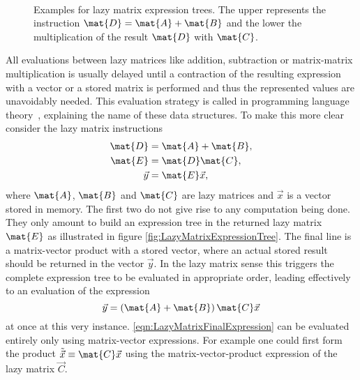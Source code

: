 \begin{figure}
	\centering
	 \\[0.8em]
	\caption[Examples for lazy matrix expression trees]
	{
		Examples for lazy matrix expression trees.
		The upper represents the instruction
		$\mat{D} = \mat{A} + \mat{B}$
		and the lower the multiplication of the result $\mat{D}$
		with $\mat{C}$.
	}
	\label{fig:LazyMatrixExpressionTree}
\end{figure}
All evaluations between lazy matrices
like addition, subtraction or matrix-matrix multiplication
is usually delayed until a contraction of the resulting
expression with a vector or a stored matrix is performed
and thus the represented values are unavoidably needed.
This evaluation strategy is called 
in programming language theory~\cite{Hudak1989},
explaining the name of these data structures.
To make this more clear consider the lazy matrix instructions
\begin{equation}
	\begin{aligned}
		\label{eqn:LazyMatrixInstructions}
		\mat{D} &= \mat{A} + \mat{B}, \\
		\mat{E} &= \mat{D} \mat{C}, \\
		\vec{y} &= \mat{E} \vec{x},
	\end{aligned}
\end{equation}
where $\mat{A}$, $\mat{B}$ and $\mat{C}$ are lazy matrices
and $\vec{x}$ is a vector stored in memory.
The first two do not give rise to any computation being done.
They only amount to build an expression tree in the returned
lazy matrix $\mat{E}$ as illustrated in figure \vref{fig:LazyMatrixExpressionTree}.
The final line is a matrix-vector product with a stored vector,
where an actual stored result should be returned in the vector $\vec{y}$.
In the lazy matrix sense this triggers the complete expression tree to be
evaluated in appropriate order,
leading effectively to an evaluation of the expression
\begin{equation}
	\vec{y} = \left( \mat{A} + \mat{B} \right) \mat{C} \vec{x}
	\label{eqn:LazyMatrixFinalExpression}
\end{equation}
at once at this very instance.
\eqref{eqn:LazyMatrixFinalExpression} can be evaluated entirely only using
matrix-vector \contraction expressions.
For example one could first form the product $\tilde{\vec{x}} \equiv \mat{C} \vec{x}$
using the matrix-vector-product expression of the lazy matrix $\vec{C}$.
